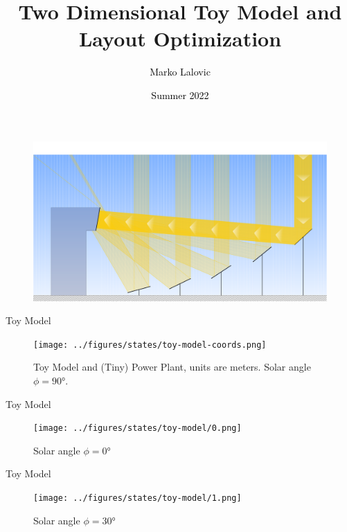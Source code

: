 \documentclass[10pt, xcolor={dvipsnames}]{beamer}
\title[2D Toy Model Layout Optimization]{Two Dimensional Toy Model and Layout Optimization}
\author[\textcolor{white}{Marko Lalovic}]{\textcolor{black}{Marko Lalovic} \vspace{-.7cm}}
\date[\textcolor{white}{July 12, 2022}]{\textcolor{black}{Summer 2022}}
\begin{document}
\begin{frame}
\begin{center}
\maketitle
\begin{figure}
    \includegraphics[width=\linewidth]{../figures/solar-toy-model-crop.pdf}
\end{figure}
\end{center}
\end{frame}


\begin{frame}{Toy Model}

\begin{center}
\begin{figure}
\texttt{[image: ../figures/states/toy-model-coords.png]}
\caption{Toy Model and (Tiny) Power Plant, units are meters. Solar angle $\phi = 90$°.}
\end{figure}
\end{center}
\end{frame}

\begin{frame}{Toy Model}
\begin{center}
\begin{figure}
\texttt{[image: ../figures/states/toy-model/0.png]}
\caption{Solar angle $\phi = 0$°}
\end{figure}
\end{center}
\end{frame}

\begin{frame}{Toy Model}
\begin{center}
\begin{figure}
\texttt{[image: ../figures/states/toy-model/1.png]}
\caption{Solar angle $\phi = 30$°}
\end{figure}
\end{center}
\end{frame}
\end{document}
